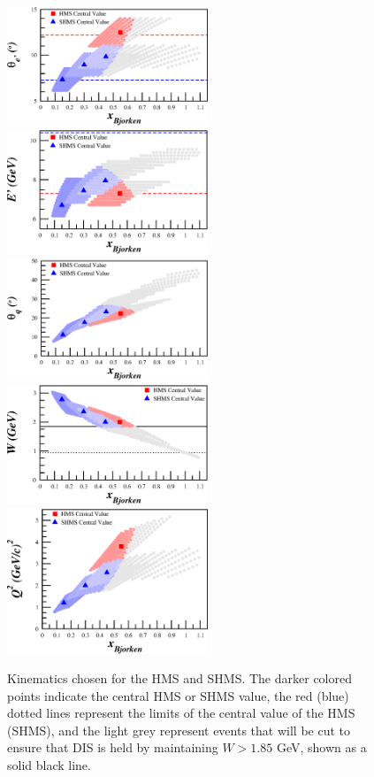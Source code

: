 \documentclass[11pt]{article}
\begin{document}
\begin{figure}
	\begin{center}
	\includegraphics[width=6cm]{hms_shms_theta.eps} \hspace{10px} \includegraphics[width=6cm]{hms_shms_eprime.eps}	
	\includegraphics[width=6cm]{hms_shms_theta_q.eps} \hspace{10px} \includegraphics[width=6cm]{hms_shms_w.eps}	
	\includegraphics[width=6cm]{hms_shms_q2.eps}	
	\end{center}
	\caption [Kinematics] {Kinematics chosen for the HMS and SHMS. The darker colored points indicate the central HMS or SHMS value, the red (blue) dotted lines represent the limits of the central value of the HMS (SHMS), and the light grey represent events that will be cut to ensure that DIS is held by maintaining $W>1.85$ GeV, shown as a solid black line.}
	\label{fig-kine}
\end{figure}
\end{document}
